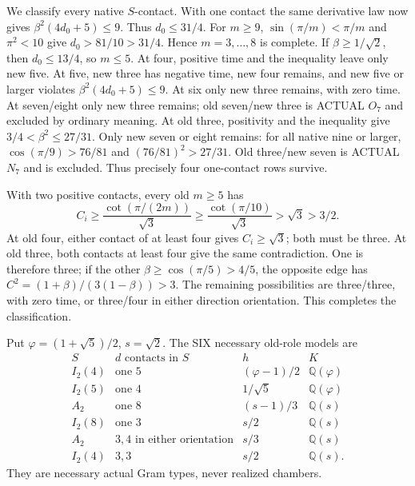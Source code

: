 \documentclass[11pt]{article}
\begin{document}
We classify every native \(S\)-contact.
With one contact the same derivative law
now gives \(\beta^2(4d_0+5)\le9\).
Thus \(d_0\le31/4\).
For \(m\ge9\), \(\sin(\pi/m)<\pi/m\) and
\(\pi^2<10\) give \(d_0>81/10>31/4\).
Hence \(m=3,\ldots,8\) is complete.
If \(\beta\ge1/\sqrt2\), then
\(d_0\le13/4\), so \(m\le5\).
At four, positive time and the inequality
leave only new five.
At five, new three has negative time,
new four remains, and new five or larger
violates \(\beta^2(4d_0+5)\le9\).
At six only new three remains, with
zero time.
At seven/eight only new three remains;
old seven/new three is ACTUAL \(O_7\)
and excluded by ordinary meaning.
At old three, positivity and the inequality
give \(3/4<\beta^2\le27/31\).
Only new seven or eight remains:
for all native nine or larger,
\(\cos(\pi/9)>76/81\) and
\((76/81)^2>27/31\).
Old three/new seven is ACTUAL \(N_7\)
and is excluded.
Thus precisely four one-contact rows survive.

With two positive contacts, every old
\(m\ge5\) has
\[
                   C_i\ge{\frac{\cot(\pi/(2m))}{\sqrt3}}
                       \ge{\frac{\cot(\pi/10)}{\sqrt3}}
                       >\sqrt3>3/2 .
\]
At old four, either contact of at least
four gives \(C_i\ge\sqrt3\);
both must be three.
At old three, both contacts at least four
give the same contradiction.
One is therefore three; if the other
\(\beta\ge\cos(\pi/5)>4/5\), the opposite
edge has \(C^2=(1+\beta)/(3(1-\beta))>3\).
The remaining possibilities are three/three,
with zero time, or three/four in either
direction orientation.
This completes the classification.

Put \(\varphi=(1+\sqrt5)/2\), \(s=\sqrt2\).
The SIX necessary old-role models are
\[
 \begin{array}{c|c|c|c}
 S&d\text{ contacts in }S&h&K\\ \hline
 I_2(4)&\text{one }5&(\varphi-1)/2&\mathbb Q(\varphi)\\
 I_2(5)&\text{one }4&1/\sqrt5&\mathbb Q(\varphi)\\
 A_2&\text{one }8&(s-1)/3&\mathbb Q(s)\\
 I_2(8)&\text{one }3&s/2&\mathbb Q(s)\\
 A_2&3,4\text{ in either orientation}&s/3&\mathbb Q(s)\\
 I_2(4)&3,3&s/2&\mathbb Q(s).
 \end{array}
\tag{A14six}\label{eq:arithA14sixmodels}
\]
They are necessary actual Gram types,
never realized chambers.
\end{document}
